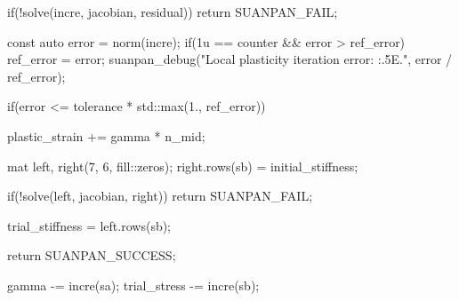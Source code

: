 \begin{cppcode}
{{        if(!solve(incre, jacobian, residual)) return SUANPAN_FAIL;

        const auto error = norm(incre);
        if(1u == counter && error > ref_error) ref_error = error;
        suanpan_debug("Local plasticity iteration error: {:.5E}.\n", error / ref_error);

        if(error <= tolerance * std::max(1., ref_error)) {
            plastic_strain += gamma * n_mid;

            mat left, right(7, 6, fill::zeros);
            right.rows(sb) = initial_stiffness;

            if(!solve(left, jacobian, right)) return SUANPAN_FAIL;

            trial_stiffness = left.rows(sb);

            return SUANPAN_SUCCESS;
        }

        gamma -= incre(sa);
        trial_stress -= incre(sb);
    }
}
\end{cppcode}